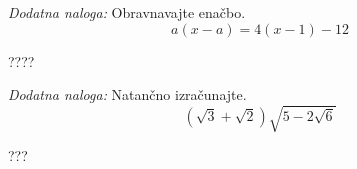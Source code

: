 \documentclass[addpoints]{exam}
\begin{document}
\begin{questions}






     \newpage



    \bonusquestion[3]
    \textit{Dodatna naloga:} Obravnavajte enačbo. $$a(x-a)=4(x-1)-12$$

    \begin{solution}[10cm]
        ????
    \end{solution}




        

    \bonusquestion[2]
    \textit{Dodatna naloga:} Natančno izračunajte. $$ \left(\sqrt{3}+\sqrt{2}\right)\sqrt{5-2\sqrt{6}} $$

    \begin{solution}[7cm]
        ???
    \end{solution}




\end{questions}
\end{document}

